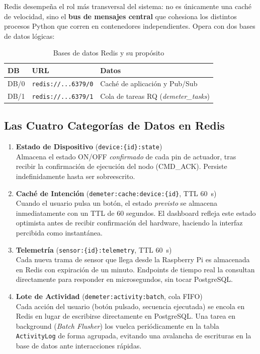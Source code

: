 Redis desempeña el rol más transversal del sistema: no es únicamente una caché de velocidad, 
sino el \textbf{bus de mensajes central} que cohesiona los distintos procesos Python que corren 
en contenedores independientes. Opera con dos bases de datos lógicas:

\begin{table}[H]
    \centering
    \caption{Bases de datos Redis y su propósito}
    \begin{tabular}{llp{8cm}}
        \toprule
        \textbf{DB} & \textbf{URL} & \textbf{Datos} \\
        \midrule
        DB/0 & \texttt{redis://...6379/0} & Caché de aplicación y Pub/Sub \\
        DB/1 & \texttt{redis://...6379/1} & Cola de tareas RQ (\textit{demeter\_tasks}) \\
        \bottomrule
    \end{tabular}
\end{table}

\subsection{Las Cuatro Categorías de Datos en Redis}

\begin{enumerate}

\item \textbf{Estado de Dispositivo} (\texttt{device:\{id\}:state})\\ 
Almacena el estado ON/OFF \textit{confirmado} de cada pin de actuador, tras recibir la 
confirmación de ejecución del nodo (CMD\_ACK). Persiste indefinidamente hasta ser sobreescrito.

\item \textbf{Caché de Intención} (\texttt{demeter:cache:device:\{id\}}, TTL 60~s)\\
Cuando el usuario pulsa un botón, el estado \textit{previsto} se almacena inmediatamente con 
un TTL de 60 segundos. El dashboard refleja este estado optimista antes de recibir confirmación 
del hardware, haciendo la interfaz percibida como instantánea.

\item \textbf{Telemetría} (\texttt{sensor:\{id\}:telemetry}, TTL 60~s)\\
Cada nueva trama de sensor que llega desde la Raspberry Pi es almacenada en Redis con expiración 
de un minuto. Endpoints de tiempo real la consultan directamente para responder en 
microsegundos, sin tocar PostgreSQL.

\item \textbf{Lote de Actividad} (\texttt{demeter:activity:batch}, cola FIFO)\\
Cada acción del usuario (botón pulsado, secuencia ejecutada) se encola en Redis en lugar de 
escribirse directamente en PostgreSQL. Una tarea en background (\textit{Batch Flusher}) 
los vuelca periódicamente en la tabla \texttt{ActivityLog} de forma agrupada, evitando una 
avalancha de escrituras en la base de datos ante interacciones rápidas.

\end{enumerate}

